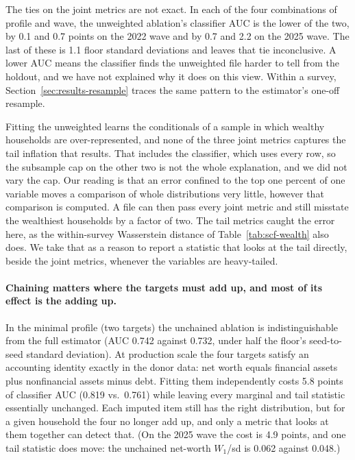 The ties on the joint metrics are not exact. In each of the four
combinations of profile and wave, the unweighted ablation's classifier AUC
is the lower of the two, by 0.1 and 0.7 points on the 2022 wave and by 0.7
and 2.2 on the 2025 wave. The last of these is 1.1 floor standard deviations
and leaves that tie inconclusive. A lower AUC means the classifier finds the
unweighted file harder to tell from the holdout, and we have not explained
why it does on this view. Within a survey,
Section~\ref{sec:results-resample} traces the same pattern to the
estimator's one-off resample.

Fitting the \scf{} unweighted learns the conditionals of a sample in which
wealthy households are over-represented, and none of the three joint metrics
captures the tail inflation that results. That includes the classifier,
which uses every row, so the subsample cap on the other two is not the whole
explanation, and we did not vary the cap. Our reading is that an error
confined to the top one percent of one variable moves a comparison of whole
distributions very little, however that comparison is computed. A file can
then pass every joint metric and still misstate the wealthiest households by
a factor of two. The tail metrics caught the error here, as the
within-survey Wasserstein distance of Table~\ref{tab:scf-wealth} also does.
We take that as a reason to report a statistic that looks at the tail
directly, beside the joint metrics, whenever the variables are heavy-tailed.

\paragraph{Chaining matters where the targets must add up, and most of its
effect is the adding up.} In the
minimal profile (two targets) the unchained ablation is indistinguishable
from the full estimator (AUC 0.742 against 0.732, under half the floor's
seed-to-seed standard deviation). At production scale the four targets
satisfy an accounting identity exactly in the donor data: net worth equals
financial assets plus nonfinancial assets minus debt. Fitting them
independently costs 5.8 points of classifier AUC (0.819 vs.\ 0.761)
while leaving every marginal and tail statistic essentially unchanged. Each
imputed item still has the right distribution, but for a given household the
four no longer add up, and only a metric that looks at them together can
detect that. (On the 2025 wave the cost is 4.9 points, and one tail statistic
does move: the unchained net-worth $W_1$/sd is 0.062 against 0.048.)

